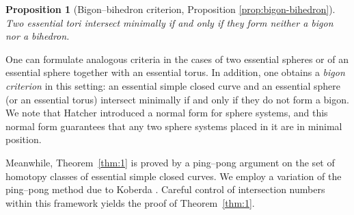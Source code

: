 \documentclass[12pt,a4paper]{amsart}
\numberwithin{equation}{section}
\DeclareMathOperator{\Out}{Out}
\newcommand{\FF}{\mathbb{F}}
\theoremstyle{plain}
\newtheorem{theorem}{Theorem}[section]
\newtheorem{proposition}[theorem]{Proposition}
\theoremstyle{definition}
\theoremstyle{remark}
\begin{document}

\begin{proposition}[Bigon--bihedron criterion, Proposition \ref{prop:bigon-bihedron}]
    Two essential tori intersect minimally if and only if they form neither a bigon nor a bihedron.
\end{proposition}

One can formulate analogous criteria in the cases of two essential spheres or of an essential sphere together with an essential torus.  
In addition, one obtains a \emph{bigon criterion} in this setting: an essential simple closed curve and an essential sphere (or an essential torus) intersect minimally if and only if they do not form a bigon.  
We note that Hatcher \cite{MR1314940} introduced a normal form for sphere systems, and this normal form guarantees that any two sphere systems placed in it are in minimal position.

Meanwhile, Theorem~\ref{thm:1} is proved by a ping--pong argument on the set of homotopy classes of essential simple closed curves.  
We employ a variation of the ping--pong method due to Koberda \cite{MR3000498}.  
Careful control of intersection numbers within this framework yields the proof of Theorem~\ref{thm:1}.


\end{document}
